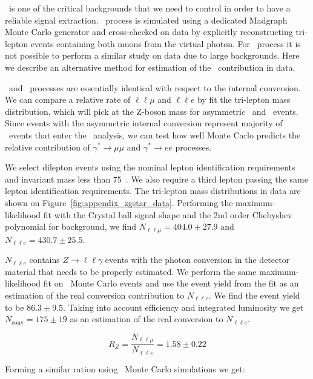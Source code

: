 \Wgstar\ is one of the critical backgrounds that we need to control
in order to have a reliable signal extraction. \WgstarMM\ process is
simulated using a dedicated Madgraph Monte Carlo generator and
cross-checked on data by explicitly reconstructing tri-lepton events
containing both muons from the virtual photon.
For \WgstarEE\ process it is not
possible to perform a similar study on data due to large
backgrounds. Here we describe an alternative method for
estimation of the \WgstarEE\ contribution in data.

\Wgstar\ and \Zgstar\ processes are essentially identical with
respect to the internal conversion. We can compare a relative rate of
$\ell\ell\mu$ and $\ell\ell e$ by fit the tri-lepton mass
distribution, which will pick at the Z-boson mass for
asymmetric \ZgstarMM\ and \ZgstarEE\ events. Since events with the
asymmetric internal conversion represent majority of \Wgstar\ events
that enter the \hww\ analysis, we can test how well Monte Carlo
predicts the relative contribution of $\gamma^*\to\mu\mu$ and
$\gamma^*\to ee$ processes.

We select dilepton events using the nominal lepton identification
requirements and invariant mass less than 75~\GeV{}. We also require a
third lepton passing the same lepton identification requirements. The
tri-lepton mass distributions in data are shown on
Figure~\ref{fig:appendix_zgstar_data}. Performing the
maximum-likelihood fit with the Crystal ball signal shape and the 2nd
order Chebyshev polynomial for background, we find
$N_{\ell\ell\mu}=404.0\pm27.9$ and $N_{\ell\ell
e}=430.7\pm25.5$. 

$N_{\ell\ell e}$ contains $Z\to\ell\ell\gamma$ events with the photon
conversion in the detector material that needs to be properly
estimated. We perform the same maximum-likelihood fit on \dyll\ Monte
Carlo events and use the event yield from the fit as an estimation of
the real conversion contribution to $N_{\ell\ell e}$. We find the
event yield to be $86.3\pm9.5$. Taking into account efficiency and
integrated luminosity we get $N_{\mathrm{conv}}=175\pm19$ as an
estimation of the real conversion to $N_{\ell\ell e}$.

\begin{equation}
    R_Z = \frac{N_{\ell\ell\mu}}{N_{\ell\ell e}} = 1.58\pm0.22
\end{equation}

Forming a similar ration using \Wgstar\ Monte Carlo simulations we get:

